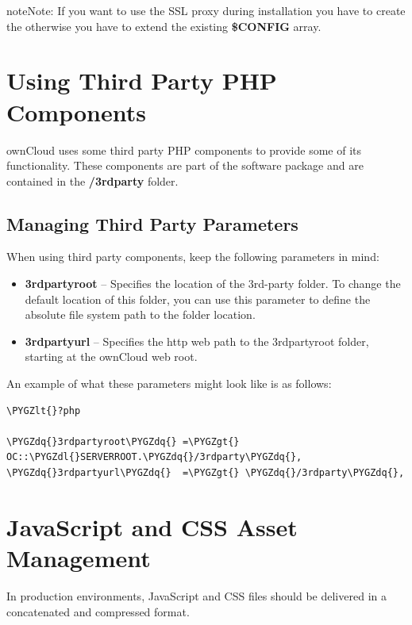 \documentclass[letterpaper,10pt,english]{sphinxmanual}
\def\PYGZlt{\char`\<}
\def\PYGZgt{\char`\>}
\def\PYGZdl{\char`\$}
\def\PYGZdq{\char`\"}
\begin{document}
\begin{notice}{note}{Note:}
If you want to use the SSL proxy during installation you have to
create the  otherwise you have to extend the existing
\textbf{\$CONFIG} array.
\end{notice}


\section{Using Third Party PHP Components}
\label{configuration_server/thirdparty_php_configuration:using-third-party-php-components}\label{configuration_server/thirdparty_php_configuration::doc}
ownCloud uses some third party PHP components to provide some of its functionality. These components are part of the software package and are contained in the \textbf{/3rdparty} folder.


\subsection{Managing Third Party Parameters}
\label{configuration_server/thirdparty_php_configuration:managing-third-party-parameters}
When using third party components, keep the following parameters in mind:
\begin{itemize}
\item {} 
\textbf{3rdpartyroot} -- Specifies the location of the 3rd-party folder. To change the default location of this folder, you can use this parameter to define the absolute file system path to the folder location.

\item {} 
\textbf{3rdpartyurl} -- Specifies the http web path to the 3rdpartyroot folder, starting at the ownCloud web root.

\end{itemize}

An example of what these parameters might look like is as follows:

\begin{Verbatim}[commandchars=\\\{\}]
\PYGZlt{}?php

\PYGZdq{}3rdpartyroot\PYGZdq{} =\PYGZgt{} OC::\PYGZdl{}SERVERROOT.\PYGZdq{}/3rdparty\PYGZdq{},
\PYGZdq{}3rdpartyurl\PYGZdq{}  =\PYGZgt{} \PYGZdq{}/3rdparty\PYGZdq{},
\end{Verbatim}


\section{JavaScript and CSS Asset Management}
\label{configuration_server/js_css_asset_management_configuration:javascript-and-css-asset-management}\label{configuration_server/js_css_asset_management_configuration::doc}
In production environments, JavaScript and CSS files should be delivered in a concatenated and compressed format.
\end{document}
